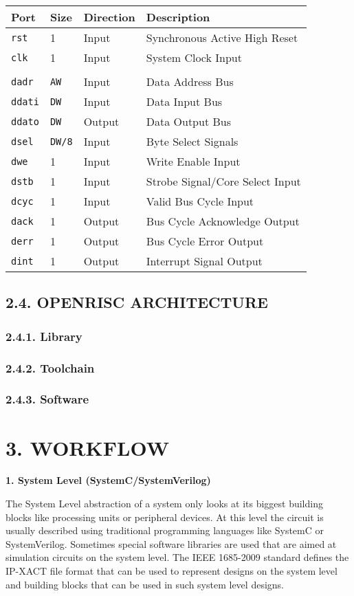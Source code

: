 \documentclass[]{article}
\begin{document}
\begin{longtable}[]{@{}llll@{}}
\toprule
Port & Size & Direction & Description\tabularnewline
\midrule
\endhead
\texttt{rst} & 1 & Input & Synchronous Active High Reset\tabularnewline
\texttt{clk} & 1 & Input & System Clock Input\tabularnewline
& & &\tabularnewline
\texttt{dadr} & \texttt{AW} & Input & Data Address Bus\tabularnewline
\texttt{ddati} & \texttt{DW} & Input & Data Input Bus\tabularnewline
\texttt{ddato} & \texttt{DW} & Output & Data Output Bus\tabularnewline
\texttt{dsel} & \texttt{DW/8} & Input & Byte Select
Signals\tabularnewline
\texttt{dwe} & 1 & Input & Write Enable Input\tabularnewline
\texttt{dstb} & 1 & Input & Strobe Signal/Core Select
Input\tabularnewline
\texttt{dcyc} & 1 & Input & Valid Bus Cycle Input\tabularnewline
\texttt{dack} & 1 & Output & Bus Cycle Acknowledge Output\tabularnewline
\texttt{derr} & 1 & Output & Bus Cycle Error Output\tabularnewline
\texttt{dint} & 1 & Output & Interrupt Signal Output\tabularnewline
\bottomrule
\end{longtable}

\subsection{2.4. OPENRISC ARCHITECTURE}\label{openrisc-architecture}

\subsubsection{2.4.1. Library}\label{library}

\subsubsection{2.4.2. Toolchain}\label{toolchain}

\subsubsection{2.4.3. Software}\label{software}

\section{3. WORKFLOW}\label{workflow}

\textbf{1. System Level (SystemC/SystemVerilog)}

The System Level abstraction of a system only looks at its biggest
building blocks like processing units or peripheral devices. At this
level the circuit is usually described using traditional programming
languages like SystemC or SystemVerilog. Sometimes special software
libraries are used that are aimed at simulation circuits on the system
level. The IEEE 1685-2009 standard defines the IP-XACT file format that
can be used to represent designs on the system level and building blocks
that can be used in such system level designs.
\end{document}
